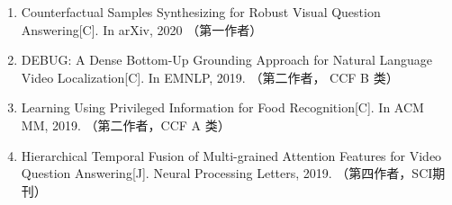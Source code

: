 \begin{publications}
\begin{enumerate}
\item{
Counterfactual Samples Synthesizing for Robust Visual Question Answering[C].
In arXiv, 2020
（第一作者）
}

\item{
DEBUG: A Dense Bottom-Up Grounding Approach for Natural Language Video Localization[C].
In EMNLP, 2019.
（第二作者， CCF B 类）
}

\item{
Learning Using Privileged Information for Food Recognition[C].
In ACM MM, 2019.
（第二作者，CCF A 类）
}

\item{
Hierarchical Temporal Fusion of Multi-grained Attention Features for Video Question Answering[J]. 
Neural Processing Letters, 2019. 
（第四作者，SCI期刊）
} 
\end{enumerate}


\end{publications}
